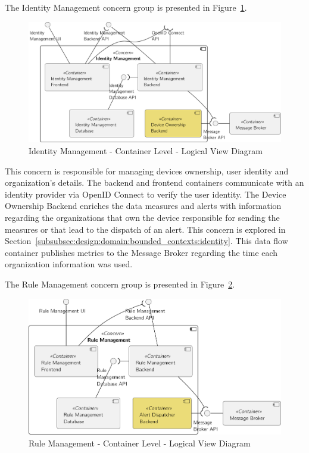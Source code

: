 The Identity Management concern group is presented in Figure~\ref{fig:design:architecture:platform:containers:logical:identity}.

\begin{figure}[H]
   \centering
   \includegraphics[page=1,width=0.9\columnwidth]{assets/diagrams/design/architectural/level2/logical/identity-management-context.pdf}
   \caption[Identity Management - Container Level - Logical View Diagram]{Identity Management - Container Level - Logical View Diagram}
   \label{fig:design:architecture:platform:containers:logical:identity}
\end{figure}

This concern is responsible for managing devices ownership, user identity and organization's details. The backend and frontend containers communicate with an identity provider via OpenID Connect to verify the user identity. The Device Ownership Backend enriches the data measures and alerts with information regarding the organizations that own the device responsible for sending the measures or that lead to the dispatch of an alert. This concern is explored in Section~\ref{subsubsec:design:domain:bounded_contexts:identity}. This data flow container publishes metrics to the Message Broker regarding the time each organization information was used.

The Rule Management concern group is presented in Figure~\ref{fig:design:architecture:platform:containers:logical:rule}.

\begin{figure}[H]
   \centering
   \includegraphics[page=1,width=0.8\columnwidth]{assets/diagrams/design/architectural/level2/logical/rule-management-context.pdf}
   \caption[Rule Management - Container Level - Logical View Diagram]{Rule Management - Container Level - Logical View Diagram}
   \label{fig:design:architecture:platform:containers:logical:rule}
\end{figure}

